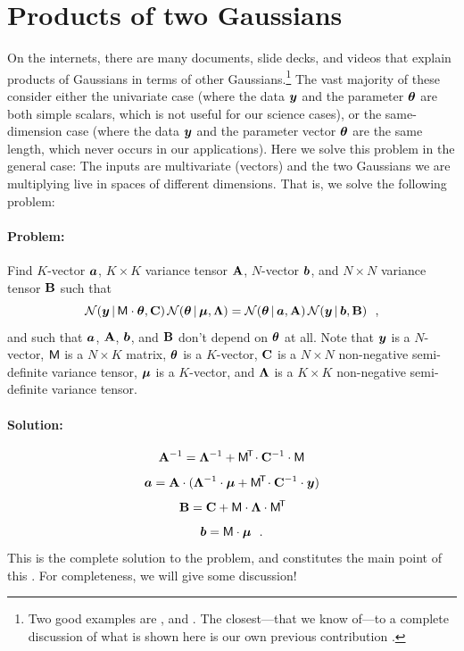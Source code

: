 \section{Products of two Gaussians}\label{sec:problemsolution}

On the internets, there are many documents, slide decks, and videos
that explain products of Gaussians in terms of other Gaussians.\footnote{Two
  good examples are \cite{roweis}, and \cite{cookbook}. The closest---that we know
  of---to a complete
  discussion of what is shown here is our own previous contribution \cite{luger}.}
The vast majority of these consider either the univariate case (where
the data $\boldsymbol{y}$ and the parameter $\boldsymbol{\theta}$ are both simple scalars, which
is not useful for our science cases), or the same-dimension case (where the data
$\boldsymbol{y}$ and the parameter vector $\boldsymbol{\theta}$ are the same length, which never
occurs in our applications).
Here we solve this problem in the general case:
The inputs are multivariate (vectors) and the two Gaussians we are
multiplying live in spaces of different dimensions.
That is, we solve the following problem:

\paragraph{Problem:}
Find $K$-vector $\boldsymbol{a}$, $K\times K$ variance tensor $\mathbf{A}$, $N$-vector $\boldsymbol{b}$,
and $N\times N$ variance tensor $\mathbf{B}$ such that
\begin{equation}\label{eq:problem}
\mathcal{N}\!\,(\boldsymbol{y}\,|\,\mathsf{M}\cdot\boldsymbol{\theta},\mathbf{C})\,\mathcal{N}\!\,(\boldsymbol{\theta}\,|\,\boldsymbol{\mu},\mathbf{\Lambda})
 = \mathcal{N}\!\,(\boldsymbol{\theta}\,|\,\boldsymbol{a},\mathbf{A})\,\mathcal{N}\!\,(\boldsymbol{y}\,|\,\boldsymbol{b},\mathbf{B}) ~~,
\end{equation}
and such that $\boldsymbol{a}$, $\mathbf{A}$, $\boldsymbol{b}$, and $\mathbf{B}$ don't depend on $\boldsymbol{\theta}$ at all.
Note that
$\boldsymbol{y}$ is a $N$-vector,
$\mathsf{M}$ is a $N\times K$ matrix,
$\boldsymbol{\theta}$ is a $K$-vector,
$\mathbf{C}$ is a $N\times N$ non-negative semi-definite variance tensor,
$\boldsymbol{\mu}$ is a $K$-vector,
and
$\mathbf{\Lambda}$ is a $K\times K$ non-negative semi-definite variance tensor.

\paragraph{Solution:}
\begin{equation}\label{eq:A}
\mathbf{A}^{-1} = \mathbf{\Lambda}^{-1} + \mathsf{M}^{\!\mathsf{T}\!} \cdot \mathbf{C}^{-1} \cdot \mathsf{M}
\end{equation}
\begin{equation}\label{eq:a}
\boldsymbol{a} = \mathbf{A} \cdot (\mathbf{\Lambda}^{-1} \cdot \boldsymbol{\mu} + \mathsf{M}^{\!\mathsf{T}\!} \cdot \mathbf{C}^{-1} \cdot \boldsymbol{y})
\end{equation}
\begin{equation}\label{eq:B}
\mathbf{B} = \mathbf{C} + \mathsf{M} \cdot \mathbf{\Lambda} \cdot \mathsf{M}^{\!\mathsf{T}\!}
\end{equation}
\begin{equation}\label{eq:b}
\boldsymbol{b} = \mathsf{M} \cdot \boldsymbol{\mu}
~~.
\end{equation}
This is the complete solution to the problem, and constitutes the main point
of this \documentname.
For completeness, we will give some discussion!

